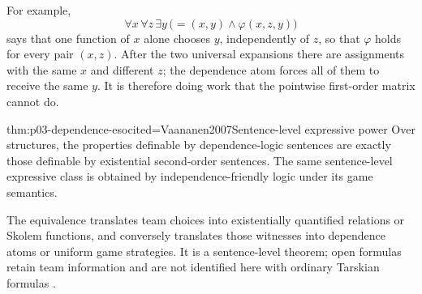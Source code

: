 For example,
\[
 \forall x\,\forall z\,\exists y\,
   \bigl(=(x,y)\land\varphi(x,z,y)\bigr)
\]
says that one function of \(x\) alone chooses \(y\), independently of \(z\),
so that \(\varphi\) holds for every pair \((x,z)\).  After the two universal
expansions there are assignments with the same \(x\) and different \(z\);
the dependence atom forces all of them to receive the same \(y\).  It is
therefore doing work that the pointwise first-order matrix cannot do.

\begin{hbtheorem}{thm:p03-dependence-eso}{cited=Vaananen2007}{Sentence-level expressive power}
Over structures, the properties definable by dependence-logic sentences are
exactly those definable by existential second-order sentences.  The same
sentence-level expressive class is obtained by independence-friendly logic
under its game semantics.
\end{hbtheorem}

The equivalence translates team choices into existentially quantified
relations or Skolem functions, and conversely translates those witnesses into
dependence atoms or uniform game strategies.  It is a sentence-level theorem;
open formulas retain team information and are not identified here with
ordinary Tarskian formulas \cite{HintikkaSandu1989,Vaananen2007}.
